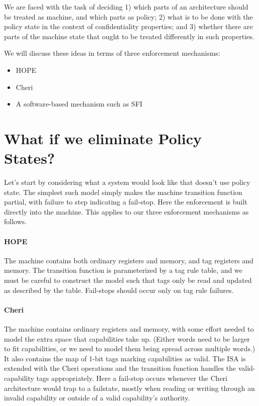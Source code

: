 \documentclass{article}
\begin{document}
We are faced with the task of deciding 1) which parts of an architecture should be treated
as machine, and which parts as policy; 2) what is to be done with the policy state in the
context of confidentiality properties; and 3) whether there are parts of the machine state
that ought to be treated differently in such properties.

We will discuss these ideas in terms of three enforcement mechanisms:

\begin{itemize}
\item HOPE
\item Cheri
\item A software-based mechanism such as SFI
\end{itemize}

\section{What if we eliminate Policy States?}

Let's start by considering what a system would look like that doesn't use policy state. The
simplest such model simply makes the machine transition function partial, with failure to step
indicating a fail-stop. Here the enforcement is built directly into the machine. This applies to
our three enforcement mechanisms as follows.

\paragraph*{HOPE} The machine contains both ordinary registers and memory, and tag registers
and memory. The transition function is parameterized by a tag rule table, and we must be
careful to construct the model such that tags only be read and updated as described by the
table. Fail-stops should occur only on tag rule failures.

\paragraph*{Cheri} The machine contains ordinary registers and memory, with some effort needed
to model the extra space that capabilities take up. (Either words need to be larger to fit
capabilities, or we need to model them being spread across multiple words.) It also contains
the map of 1-bit tags marking capabilities as valid. The ISA is extended with the Cheri
operations and the transition function handles the valid-capability tags appropriately.
Here a fail-stop occurs whenever the Cheri architecture would trap to a failstate, mostly
when reading or writing through an invalid capability or outside of a valid capability's
authority.
\end{document}
